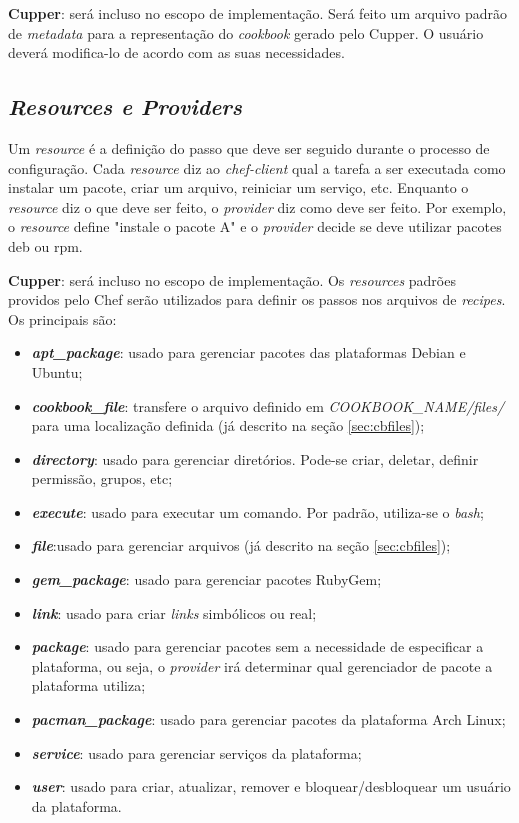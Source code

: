 \textbf{Cupper}: será incluso no escopo de implementação. Será feito um arquivo padrão de
\textit{metadata} para a representação do \textit{cookbook} gerado pelo Cupper. O usuário deverá
modifica-lo de acordo com as suas necessidades.

\subsection{\textit{Resources e Providers}}
\label{sec:cbresource}

Um \textit{resource} é a definição do passo que deve ser seguido durante o processo
de configuração. Cada \textit{resource} diz ao \textit{chef-client} qual a tarefa a ser executada
como instalar um pacote, criar um arquivo, reiniciar um serviço, etc.
Enquanto o \textit{resource} diz o que deve ser feito, o \textit{provider} diz como deve ser
feito. Por exemplo, o \textit{resource} define "instale o pacote A" e o \textit{provider} decide
se deve utilizar pacotes deb ou rpm.

\textbf{Cupper}: será incluso no escopo de implementação. Os \textit{resources} padrões
providos pelo Chef serão utilizados para definir os passos nos arquivos de
\textit{recipes}. Os principais são:

\begin{itemize}
  \item \textit{\textbf{apt\_package}}: usado para gerenciar pacotes das plataformas Debian e
    Ubuntu;
  \item \textit{\textbf{cookbook\_file}}: transfere o arquivo definido em \textit{COOKBOOK\_NAME/files/} para
    uma localização definida (já descrito na seção \ref{sec:cbfiles});
  \item \textit{\textbf{directory}}: usado para gerenciar diretórios. Pode-se criar, deletar, definir
    permissão, grupos, etc;
  \item \textit{\textbf{execute}}: usado para executar um comando. Por padrão, utiliza-se o \textit{bash};
  \item \textit{\textbf{file}}:usado para gerenciar arquivos (já descrito na seção \ref{sec:cbfiles});
  \item \textit{\textbf{gem\_package}}: usado para gerenciar pacotes RubyGem;
  \item \textit{\textbf{link}}: usado para criar \textit{links} simbólicos ou real;
  \item \textit{\textbf{package}}: usado para gerenciar pacotes sem a necessidade de especificar a plataforma,
    ou seja, o \textit{provider} irá determinar qual gerenciador de pacote a plataforma utiliza;
  \item \textit{\textbf{pacman\_package}}: usado para gerenciar pacotes da plataforma Arch Linux;
  \item \textit{\textbf{service}}: usado para gerenciar serviços da plataforma;
  \item \textit{\textbf{user}}: usado para criar, atualizar, remover e bloquear/desbloquear um usuário da plataforma.
\end{itemize}

